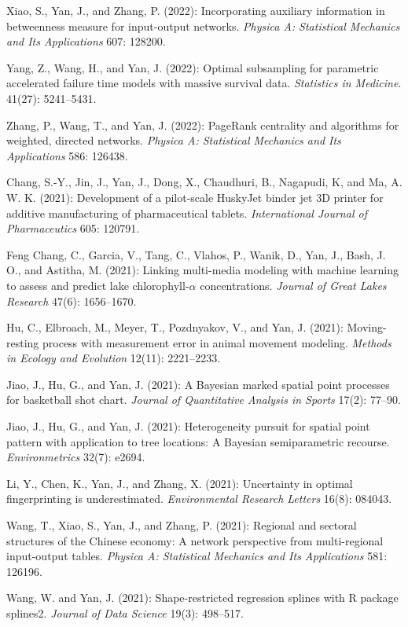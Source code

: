 \documentclass[Statistics]{vita}
\begin{document}
\begin{vita}
\begin{Publications}
\begin{RefereedJournalArticles}
  \item *Xiao, S., Yan, J., and Zhang, P. (2022): Incorporating auxiliary information in betweenness measure for input-output networks. {\em Physica A: Statistical Mechanics and Its Applications\/} 607: 128200.
  \item *Yang, Z., Wang, H., and Yan, J. (2022): Optimal subsampling for parametric accelerated failure time models with massive survival data. {\em Statistics in Medicine}. 41(27): 5241--5431.
  \item Zhang, P., Wang, T., and Yan, J. (2022): PageRank centrality and algorithms for weighted, directed networks. {\em Physica A: Statistical Mechanics and Its Applications\/} 586: 126438.
  \item Chang, S.-Y., Jin, J., Yan, J., Dong, X., Chaudhuri, B., Nagapudi, K, and Ma, A. W. K. (2021): Development of a pilot-scale HuskyJet binder jet 3D printer for additive manufacturing of pharmaceutical tablets. {\em International Journal of Pharmaceutics\/} 605: 120791.
  \item Feng Chang, C., Garcia, V., Tang, C., Vlahos, P., Wanik, D., Yan, J., Bash, J. O., and Astitha, M. (2021): Linking multi-media modeling with machine learning to assess and predict lake chlorophyll-$\alpha$ concentrations. {\em Journal of Great Lakes Research\/} 47(6): 1656--1670.
  \item *Hu, C., Elbroach, M., Meyer, T., Pozdnyakov, V., and Yan, J. (2021): Moving-resting process with measurement error in animal movement modeling. {\em Methods in Ecology and Evolution\/} 12(11): 2221--2233.
  \item *Jiao, J., Hu, G., and Yan, J. (2021): A Bayesian marked spatial point processes for basketball shot chart. {\em Journal of Quantitative Analysis in Sports\/} 17(2): 77--90. 
  \item *Jiao, J., Hu, G., and Yan, J. (2021): Heterogeneity pursuit for spatial point pattern with application to tree locations: A Bayesian semiparametric recourse. {\em Environmetrics\/} 32(7): e2694.
  \item *Li, Y., Chen, K., Yan, J., and Zhang, X. (2021): Uncertainty in optimal fingerprinting is underestimated. {\em Environmental Research Letters\/} 16(8): 084043.
  \item *Wang, T., Xiao, S., Yan, J., and Zhang, P. (2021): Regional and sectoral structures of the Chinese economy: A network perspective from multi-regional input-output tables. {\em Physica A: Statistical Mechanics and Its Applications\/} 581: 126196.
  \item *Wang, W. and Yan, J. (2021): Shape-restricted regression splines with R package splines2. {\em Journal of Data Science\/} 19(3): 498--517.

\end{RefereedJournalArticles}
\end{Publications}
\end{vita}
\end{document}
